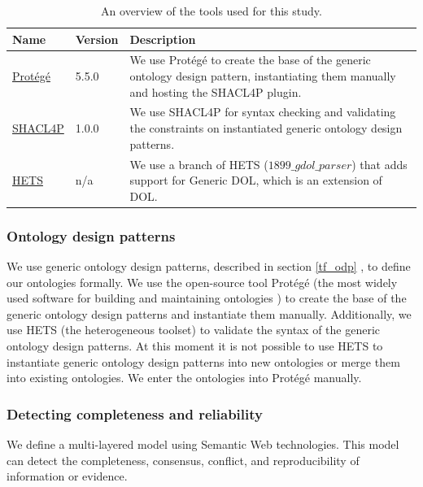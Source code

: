 \begin{table}[!htbp]
\centering
\caption{An overview of the tools used for this study.}
\begin{tabular}{| p{2cm} | p{} | p{} |}
\hline
\rowcolor{document}
\color{documentText}Name & \color{documentText}Version & \color{documentText}Description \\
\hline
\href{https://protege.stanford.edu/}{Prot\'eg\'e} & 5.5.0 & We use Prot\'eg\'e to create the base of the generic ontology design pattern, instantiating them manually and hosting the SHACL4P plugin. \\
\hdashline
\href{https://github.com/fekaputra/shacl-plugin}{SHACL4P} & 1.0.0 & We use SHACL4P for syntax checking and validating the constraints on instantiated generic ontology design patterns. \\
\hdashline
\href{https://github.com/spechub/Hets/tree/1899_gdol_parser}{HETS} & n/a & We use a branch of HETS ($1899\_gdol\_parser$) that adds support for Generic DOL, which is an extension of DOL. \\
\hline
\end{tabular}
\label{table:Tools}
\end{table}

\subsubsection{Ontology design patterns} \label{gen_meth}
We use generic ontology design patterns, described in section \ref{tf_odp} , to define our ontologies formally. We use the open-source tool Prot\'eg\'e (the most widely used software for building and maintaining ontologies \parencite{ME08}) to create the base of the generic ontology design patterns and instantiate them manually. Additionally, we use HETS (the heterogeneous toolset) to validate the syntax of the generic ontology design patterns. At this moment it is not possible to use HETS to instantiate generic ontology design patterns into new ontologies or merge them into existing ontologies. We enter the ontologies into Prot\'eg\'e manually. 

\subsubsection{Detecting completeness and reliability}
We define a multi-layered model using Semantic Web technologies. This model can detect the completeness, consensus, conflict, and reproducibility of information or evidence. 

